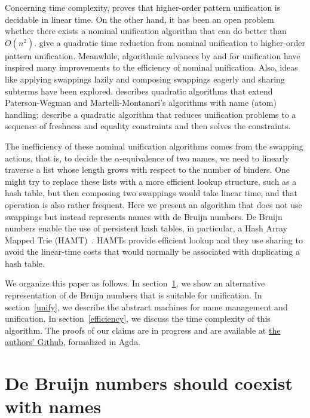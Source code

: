 \documentclass[a4paper,UKenglish]{lipics-v2016}
\begin{document}
Concerning time complexity, \citet{qian_unification_1996} proves that
higher-order pattern unification is decidable in linear time.  On the
other hand, it has been an open problem whether there exists a nominal
unification algorithm that can do better than
$O(n^2)$. \citet{levy_nominal_2012} give a quadratic time reduction
from nominal unification to higher-order pattern unification.
Meanwhile, algorithmic advances by \citet{paterson_linear_1978} and
\citet{martelli_efficient_1982} for unification have inspired many
improvements to the efficiency of nominal unification.  Also, ideas
like applying swappings lazily and composing swappings eagerly and
sharing subterms have been explored. \citet{calves_complexity_2010}
describes quadratic algorithms that extend Paterson-Wegman and
Martelli-Montanari's algorithms with name (atom) handling;
\citet{levy_efficient_2010} describe a quadratic algorithm that
reduces unification problems to a sequence of freshness and equality
constraints and then solves the constraints.

The inefficiency of these nominal unification algorithms comes from
the swapping actions, that is, to decide the $\alpha$-equivalence of
two names, we need to linearly traverse a list whose length grows with
respect to the number of binders.  One might try to replace these
lists with a more efficient lookup structure, such as a hash table,
but then composing two swappings would take linear time, and that
operation is also rather frequent.  Here we present an algorithm that
does not use swappings but instead represents names with de Bruijn
numbers. De Bruijn numbers enable the use of persistent hash tables, in
particular, a Hash Array Mapped Trie
(HAMT)~\citep{bagwell_ideal_2001}. HAMTs provide efficient lookup and
they use sharing to avoid the linear-time costs that would normally be
associated with duplicating a hash table.

We organize this paper as follows.  In section~\ref{closures}, we show
an alternative representation of de Bruijn numbers that is suitable
for unification.  In section~\ref{unify}, we describe the abstract
machines for name management and unification.  In
section~\ref{efficiency}, we discuss the time complexity of this
algorithm. The proofs of our claims are in progress and are available
at \href{https://github.com/mvcccccc/UNIF2018}{the authors' Github},
formalized in Agda.
  

\section{De Bruijn numbers should coexist with names}
\label{closures}
\end{document}
